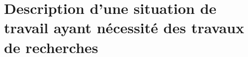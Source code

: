 \chapter{Description d'une situation de travail ayant nécessité des travaux de recherches}\label{ch:recherche}